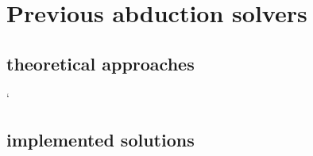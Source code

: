 \chapter{Previous abduction solvers}\label{chap:previous_solutions}
		\section{theoretical approaches}
	`	\section{implemented solutions}